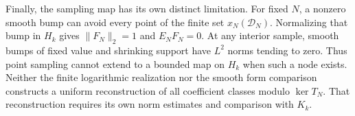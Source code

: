 Finally, the sampling map has its own distinct limitation.
For fixed $N$, a nonzero smooth bump can avoid every point of the finite
set $x_N(\mathcal D_N)$.
Normalizing that bump in $H_k$ gives $\|F_N\|_2=1$ and $E_NF_N=0$.
At any interior sample, smooth bumps of fixed value and shrinking support
have $L^2$ norms tending to zero.
Thus point sampling cannot extend to a bounded map on $H_k$ when such a node exists.
Neither the finite logarithmic realization nor the smooth form comparison
constructs a uniform reconstruction of all coefficient classes modulo $\ker T_N$.
That reconstruction requires its own norm estimates and comparison with $K_k$.
